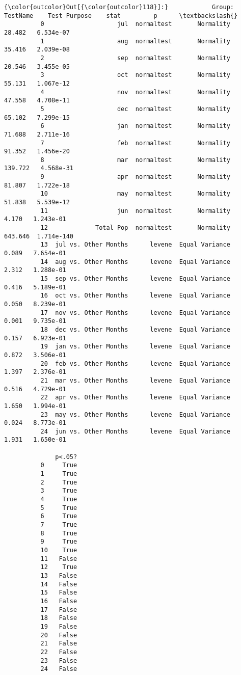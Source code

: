 \documentclass[11pt]{article}
\begin{document}
\begin{Verbatim}[commandchars=\\\{\}]
{\color{outcolor}Out[{\color{outcolor}118}]:}            Group:          TestName    Test Purpose    stat         p      \textbackslash{}
          0                    jul  normaltest       Normality   28.482   6.534e-07   
          1                    aug  normaltest       Normality   35.416   2.039e-08   
          2                    sep  normaltest       Normality   20.546   3.455e-05   
          3                    oct  normaltest       Normality   55.131   1.067e-12   
          4                    nov  normaltest       Normality   47.558   4.708e-11   
          5                    dec  normaltest       Normality   65.102   7.299e-15   
          6                    jan  normaltest       Normality   71.688   2.711e-16   
          7                    feb  normaltest       Normality   91.352   1.456e-20   
          8                    mar  normaltest       Normality  139.722   4.568e-31   
          9                    apr  normaltest       Normality   81.807   1.722e-18   
          10                   may  normaltest       Normality   51.838   5.539e-12   
          11                   jun  normaltest       Normality    4.170   1.243e-01   
          12             Total Pop  normaltest       Normality  643.646  1.714e-140   
          13  jul vs. Other Months      levene  Equal Variance    0.089   7.654e-01   
          14  aug vs. Other Months      levene  Equal Variance    2.312   1.288e-01   
          15  sep vs. Other Months      levene  Equal Variance    0.416   5.189e-01   
          16  oct vs. Other Months      levene  Equal Variance    0.050   8.239e-01   
          17  nov vs. Other Months      levene  Equal Variance    0.001   9.735e-01   
          18  dec vs. Other Months      levene  Equal Variance    0.157   6.923e-01   
          19  jan vs. Other Months      levene  Equal Variance    0.872   3.506e-01   
          20  feb vs. Other Months      levene  Equal Variance    1.397   2.376e-01   
          21  mar vs. Other Months      levene  Equal Variance    0.516   4.729e-01   
          22  apr vs. Other Months      levene  Equal Variance    1.650   1.994e-01   
          23  may vs. Other Months      levene  Equal Variance    0.024   8.773e-01   
          24  jun vs. Other Months      levene  Equal Variance    1.931   1.650e-01   
          
              p<.05?  
          0     True  
          1     True  
          2     True  
          3     True  
          4     True  
          5     True  
          6     True  
          7     True  
          8     True  
          9     True  
          10    True  
          11   False  
          12    True  
          13   False  
          14   False  
          15   False  
          16   False  
          17   False  
          18   False  
          19   False  
          20   False  
          21   False  
          22   False  
          23   False  
          24   False  
\end{Verbatim}
            
\end{document}
